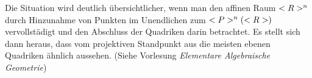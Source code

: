 \begin{remark}
	Die Situation wird deutlich übersichtlicher, wenn man den affinen Raum $<R>^n$ durch Hinzunahme von Punkten im Unendlichen zum  $<P>^n(<R>)$ vervollstädigt und den Abschluss der Quadriken darin betrachtet. Es stellt sich dann heraus, dass vom projektiven Standpunkt aus die meisten ebenen Quadriken ähnlich aussehen. (Siehe Vorlesung \textit{Elementare Algebraische Geometrie})
\end{remark}
